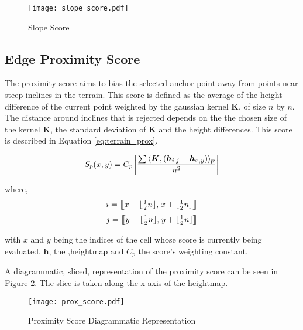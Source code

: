         \begin{figure}[h]
            \centering
            \texttt{[image: slope\_score.pdf]}
            \caption{Slope Score}
            \label{fig:slope_score}
        \end{figure}

    \subsection{Edge Proximity Score}
    The proximity score aims to bias the selected anchor point away from points near steep inclines in the terrain. This score is defined as the average of the height
    difference of the current point weighted by the gaussian kernel \(\boldsymbol{K}\), of size \(n\) by \(n\). The distance around inclines that is rejected depends on the the
    chosen size of the kernel \(\boldsymbol{K}\), the standard deviation of \(\boldsymbol{K}\) and the height differences. This score is described in Equation
    \ref{eq:terrain_prox}.

    \begin{equation} \label{eq:terrain_prox}
        S_p(x,y) = C_p\left|\frac{\sum\left\langle\boldsymbol{K},(\boldsymbol{h}_{i,j}-\boldsymbol{h}_{x,y})\right\rangle _{\mkern-3mu F}}{n^2}\right|
    \end{equation}

    \noindent
    where,
    \[i = \big[\mkern-4.7mu\big[x- \lfloor\tfrac{1}{2}n\rfloor,\mkern2mu x+\lfloor\tfrac{1}{2}n\rfloor\big]\mkern-4.7mu\big]\]
    \[j = \big[\mkern-4.7mu\big[y-\lfloor\tfrac{1}{2}n\rfloor,\mkern2mu y+ \lfloor\tfrac{1}{2}n\rfloor\big]\mkern-4.7mu\big]\]
    
    
    \noindent
    with \(x\) and \(y\) being the indices of the cell whose score is currently being evaluated, \(\boldsymbol{h}\), the ,heightmap and \(C_p\) the score's weighting constant.
    
    A diagrammatic, sliced, representation of the proximity score can be seen in Figure \ref{fig:prox_score_diagram}. The
    slice is taken along the x axis of the heightmap.

    \begin{figure}[h]
        \centering
        \texttt{[image: prox\_score.pdf]}
        \caption{Proximity Score Diagrammatic Representation}
        \label{fig:prox_score_diagram}
    \end{figure}

